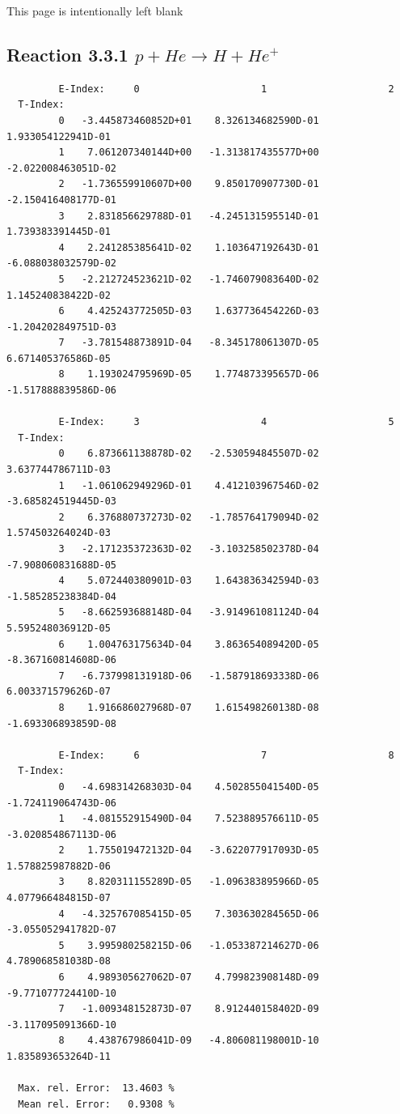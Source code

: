 \documentclass[12pt,dvips]{article}
\begin{document}
\newpage
This page is intentionally left blank
\newpage
\subsection{
Reaction 3.3.1  $  p + He \rightarrow  H + He^+ $
}



\begin{small}\begin{verbatim}
         E-Index:     0                     1                     2
  T-Index:
         0   -3.445873460852D+01    8.326134682590D-01    1.933054122941D-01
         1    7.061207340144D+00   -1.313817435577D+00   -2.022008463051D-02
         2   -1.736559910607D+00    9.850170907730D-01   -2.150416408177D-01
         3    2.831856629788D-01   -4.245131595514D-01    1.739383391445D-01
         4    2.241285385641D-02    1.103647192643D-01   -6.088038032579D-02
         5   -2.212724523621D-02   -1.746079083640D-02    1.145240838422D-02
         6    4.425243772505D-03    1.637736454226D-03   -1.204202849751D-03
         7   -3.781548873891D-04   -8.345178061307D-05    6.671405376586D-05
         8    1.193024795969D-05    1.774873395657D-06   -1.517888839586D-06

         E-Index:     3                     4                     5
  T-Index:
         0    6.873661138878D-02   -2.530594845507D-02    3.637744786711D-03
         1   -1.061062949296D-01    4.412103967546D-02   -3.685824519445D-03
         2    6.376880737273D-02   -1.785764179094D-02    1.574503264024D-03
         3   -2.171235372363D-02   -3.103258502378D-04   -7.908060831688D-05
         4    5.072440380901D-03    1.643836342594D-03   -1.585285238384D-04
         5   -8.662593688148D-04   -3.914961081124D-04    5.595248036912D-05
         6    1.004763175634D-04    3.863654089420D-05   -8.367160814608D-06
         7   -6.737998131918D-06   -1.587918693338D-06    6.003371579626D-07
         8    1.916686027968D-07    1.615498260138D-08   -1.693306893859D-08

         E-Index:     6                     7                     8
  T-Index:
         0   -4.698314268303D-04    4.502855041540D-05   -1.724119064743D-06
         1   -4.081552915490D-04    7.523889576611D-05   -3.020854867113D-06
         2    1.755019472132D-04   -3.622077917093D-05    1.578825987882D-06
         3    8.820311155289D-05   -1.096383895966D-05    4.077966484815D-07
         4   -4.325767085415D-05    7.303630284565D-06   -3.055052941782D-07
         5    3.995980258215D-06   -1.053387214627D-06    4.789068581038D-08
         6    4.989305627062D-07    4.799823908148D-09   -9.771077724410D-10
         7   -1.009348152873D-07    8.912440158402D-09   -3.117095091366D-10
         8    4.438767986041D-09   -4.806081198001D-10    1.835893653264D-11

  Max. rel. Error:  13.4603 %
  Mean rel. Error:   0.9308 %



\end{verbatim}\end{small}
\end{document}
